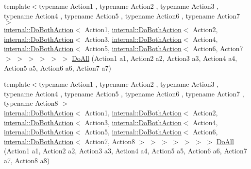 \begin{DoxyCompactItemize}
\item 
{\footnotesize template$<$typename Action1 , typename Action2 , typename Action3 , typename Action4 , typename Action5 , typename Action6 , typename Action7 $>$ }\\\hyperlink{classtesting_1_1internal_1_1_do_both_action}{internal\+::\+Do\+Both\+Action}$<$ Action1, \hyperlink{classtesting_1_1internal_1_1_do_both_action}{internal\+::\+Do\+Both\+Action}$<$ Action2, \hyperlink{classtesting_1_1internal_1_1_do_both_action}{internal\+::\+Do\+Both\+Action}$<$ Action3, \hyperlink{classtesting_1_1internal_1_1_do_both_action}{internal\+::\+Do\+Both\+Action}$<$ Action4, \hyperlink{classtesting_1_1internal_1_1_do_both_action}{internal\+::\+Do\+Both\+Action}$<$ Action5, \hyperlink{classtesting_1_1internal_1_1_do_both_action}{internal\+::\+Do\+Both\+Action}$<$ Action6, Action7 $>$ $>$ $>$ $>$ $>$ $>$ \hyperlink{namespacetesting_aadfaf4eb9897dcabe067b1d882febc86}{Do\+All} (Action1 a1, Action2 a2, Action3 a3, Action4 a4, Action5 a5, Action6 a6, Action7 a7)
\item 
{\footnotesize template$<$typename Action1 , typename Action2 , typename Action3 , typename Action4 , typename Action5 , typename Action6 , typename Action7 , typename Action8 $>$ }\\\hyperlink{classtesting_1_1internal_1_1_do_both_action}{internal\+::\+Do\+Both\+Action}$<$ Action1, \hyperlink{classtesting_1_1internal_1_1_do_both_action}{internal\+::\+Do\+Both\+Action}$<$ Action2, \hyperlink{classtesting_1_1internal_1_1_do_both_action}{internal\+::\+Do\+Both\+Action}$<$ Action3, \hyperlink{classtesting_1_1internal_1_1_do_both_action}{internal\+::\+Do\+Both\+Action}$<$ Action4, \hyperlink{classtesting_1_1internal_1_1_do_both_action}{internal\+::\+Do\+Both\+Action}$<$ Action5, \hyperlink{classtesting_1_1internal_1_1_do_both_action}{internal\+::\+Do\+Both\+Action}$<$ Action6, \hyperlink{classtesting_1_1internal_1_1_do_both_action}{internal\+::\+Do\+Both\+Action}$<$ Action7, Action8 $>$ $>$ $>$ $>$ $>$ $>$ $>$ \hyperlink{namespacetesting_a2c0e69056a8e5bc4ddc2308ba0af5214}{Do\+All} (Action1 a1, Action2 a2, Action3 a3, Action4 a4, Action5 a5, Action6 a6, Action7 a7, Action8 a8)
\item 

\end{DoxyCompactItemize}
